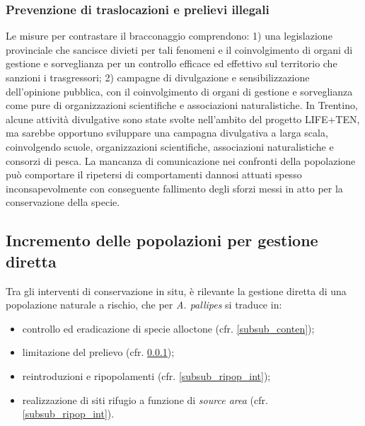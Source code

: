 \documentclass[11pt,a4paper,italian,twoside,openany]{memoir}
\begin{document}
\subsubsection{Prevenzione di traslocazioni e prelievi illegali}
\label{subsub_prev_trasl}
Le misure per contrastare il bracconaggio comprendono: 1) una legislazione provinciale che sancisce divieti per tali fenomeni e il coinvolgimento di organi di gestione e sorveglianza per un controllo efficace ed effettivo sul territorio che sanzioni i trasgressori; 2) campagne di divulgazione e sensibilizzazione dell'opinione pubblica, con il coinvolgimento di organi di gestione e sorveglianza come pure di organizzazioni scientifiche e associazioni naturalistiche. In Trentino, alcune attività divulgative sono state svolte nell'ambito del progetto LIFE+TEN, ma sarebbe opportuno sviluppare una campagna divulgativa a larga scala, coinvolgendo scuole, organizzazioni scientifiche, associazioni naturalistiche e consorzi di pesca. La mancanza di comunicazione nei confronti della popolazione può comportare il ripetersi di comportamenti dannosi attuati spesso inconsapevolmente con conseguente fallimento degli sforzi messi in atto per la conservazione della specie.

\subsection{Incremento delle popolazioni per gestione diretta}
Tra gli interventi di conservazione in situ, è rilevante la gestione diretta di una popolazione naturale a rischio, che per \emph{A. pallipes} si traduce in:
\begin{itemize}
  \item controllo ed eradicazione di specie alloctone (cfr. \ref{subsub_conten});
  \item limitazione del prelievo (cfr. \ref{subsub_prev_trasl});
  \item reintroduzioni e ripopolamenti (cfr. \ref{subsub_ripop_int}); 
  \item realizzazione di siti rifugio a funzione di \emph{source area} (cfr. \ref{subsub_ripop_int}).
\end{itemize}
\end{document}
